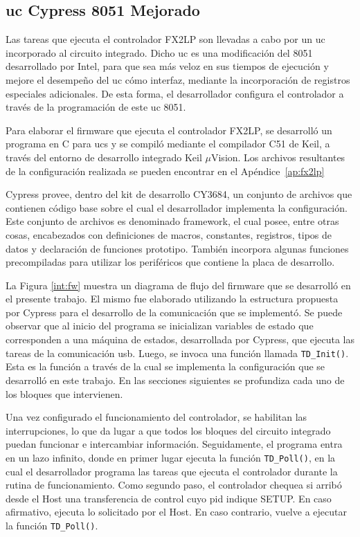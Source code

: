 \subsection{\acrlong{uc} Cypress 8051 Mejorado}
	Las tareas que ejecuta el controlador FX2LP son llevadas a cabo por un \acrshort{uc} incorporado al circuito integrado. Dicho \acrshort{uc} es una modificación del 8051 desarrollado por Intel, para que sea más veloz en sus tiempos de ejecución y mejore el desempeño del \acrshort{uc} cómo interfaz, mediante la incorporación de registros especiales adicionales.  De esta forma, el desarrollador configura el controlador a través de la programación de este \acrshort{uc} 8051.
	
	Para elaborar el firmware que ejecuta el controlador FX2LP, se desarrolló un programa en C para \acrshort{uc}s y se compiló mediante el compilador C51 de Keil, a través del entorno de desarrollo integrado Keil $\mu$Vision. Los archivos resultantes de la configuración realizada se pueden encontrar en el Apéndice~\ref{ap:fx2lp}
	
	Cypress provee, dentro del kit de desarrollo CY3684, un conjunto de archivos que contienen código base sobre el cual el desarrollador implementa la configuración. Este conjunto de archivos es denominado framework, el cual posee, entre otras cosas, encabezados con definiciones de macros, constantes, registros, tipos de datos y declaración de funciones prototipo. También incorpora algunas funciones precompiladas para utilizar los periféricos que contiene la placa de desarrollo.
	
	La Figura \ref{int:fw} muestra un diagrama de flujo del firmware que se desarrolló en el presente trabajo. El mismo fue elaborado utilizando la estructura propuesta por Cypress para el desarrollo de la comunicación que se implementó. Se puede observar que al inicio del programa se inicializan variables de estado que corresponden a una máquina de estados, desarrollada por Cypress, que ejecuta las tareas de la comunicación \acrshort{usb}. Luego, se invoca una función llamada \verb|TD_Init()|. Esta es la función a través de la cual se implementa la configuración que se desarrolló en este trabajo. En las secciones siguientes se profundiza cada uno de los bloques que intervienen.
	
	Una vez configurado el funcionamiento del controlador, se habilitan las interrupciones, lo que da lugar a que todos los bloques del circuito integrado puedan funcionar e intercambiar información. Seguidamente, el programa entra en un lazo infinito, donde en primer lugar ejecuta la función \verb|TD_Poll()|, en la cual el desarrollador programa las tareas que ejecuta el controlador durante la rutina de funcionamiento. Como segundo paso, el controlador chequea si arribó desde el Host una transferencia de control cuyo \acrshort{pid} indique SETUP. En caso afirmativo, ejecuta lo solicitado por el Host. En caso contrario, vuelve a ejecutar la función \verb|TD_Poll()|.
	
